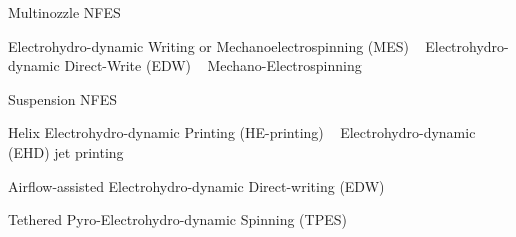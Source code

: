 \documentclass[3p,,preprint,12pt]{elsarticle}
\begin{document}
Multinozzle NFES \unskip~\cite{527120:11974322,527120:11974323,527120:11974324}

Electrohydro-dynamic Writing or Mechanoelectrospinning (MES) \unskip~\cite{527120:11974311} \mbox{}\protect\newline Electrohydro-dynamic Direct-Write (EDW) \unskip~\cite{527120:11974328} \mbox{}\protect\newline Mechano-Electrospinning \unskip~\cite{527120:11974304}

Suspension NFES \unskip~\cite{527120:12033656}

Helix Electrohydro-dynamic Printing (HE-printing) \unskip~\cite{527120:11974308} \mbox{}\protect\newline Electrohydro-dynamic (EHD) jet printing \unskip~\cite{527120:11974320}

Airflow-assisted Electrohydro-dynamic Direct-writing (EDW) \unskip~\cite{527120:11974312}

Tethered Pyro-Electrohydro-dynamic Spinning (TPES) \unskip~\cite{527120:11974307}
\end{document}
